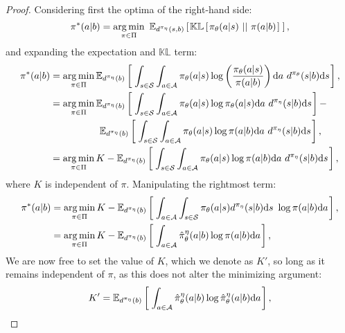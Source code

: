 \begin{proof}
Considering first the optima of the right-hand side: 
\begin{equation}
    \pi^*(a|b) = \mathop{\operatorname{arg\,min}}_{\pi \in \Pi}\ \mathbb{E}_{d^{\pi_{\eta}}(s, b)}  \left[ \hspace*{0.1em}{}  \mathbb{KL} \left[ \hspace*{0.1em}{}  \pi_{\theta}(a|s) \ ||\ {} \pi(a|b) \hspace*{0.1em} \right]{}  \hspace*{0.1em} \right]{} ,
\end{equation}
and expanding the expectation and $\mathbb{KL}$ term:
\begin{align}
    \pi^*(a|b) &= \mathop{\argmin}_{\pi \in \Pi} \mathbb{E}_{d^{\pi_{\eta}}(b)}\lspsqb{}  \int_{s\in\mathcal{S}} \int_{a\in\mathcal{A}} \pi_{\theta}(a | s)  \log \left( \frac{\pi_{\theta}(a|s)}{\pi(a | b)} \right) \d a \ d^{\pi_{\theta}}(s | b) \d s \rspsqb{}  , \\%
    &= \mathop{\argmin}_{\pi \in \Pi} \mathbb{E}_{d^{\pi_{\eta}}(b)}\lspsqb{} \int_{s\in\mathcal{S}} \int_{a\in\mathcal{A}} \pi_{\theta}(a | s)  \log \pi_{\theta}(a|s) \d a \ d^{\pi_{\eta}}(s | b) \d s \rspsqb{}  - \\
    & \hspace*{1.8cm} \mathbb{E}_{d^{\pi_{\eta}}(b)}\lspsqb{}  \int_{s\in\mathcal{S}} \int_{a\in\mathcal{A}} \pi_{\theta}(a | s)  \log \pi(a|b) \d a \ d^{\pi_{\eta}}(s | b) \d s \rspsqb{} , \\%
    &= \mathop{\argmin}_{\pi \in \Pi} K - \mathbb{E}_{d^{\pi_{\eta}}(b)}\lspsqb{} \int_{s\in\mathcal{S}} \int_{a\in\mathcal{A}} \pi_{\theta}(a | s)  \log \pi(a|b) \d a \ d^{\pi_{\eta}}(s | b) \d s \rspsqb{}  ,
\end{align}
where $K$ is independent of $\pi$.  Manipulating the rightmost term:
\begin{align}
    \pi^*(a|b) &= \mathop{\operatorname{arg\,min}}_{\pi \in \Pi} K - \mathbb{E}_{d^{\pi_{\eta}}(b)}\left[ \hspace*{0.1em}{} \int_{a\in\mathcal{A}} \int_{s\in\mathcal{S}} \pi_{\theta}(a | s) d^{\pi_{\eta}}(s | b) \mathrm{d} s \  \log \pi(a | b)  \mathrm{d} a \hspace*{0.1em} \right]{} , \\
    &= \mathop{\operatorname{arg\,min}}_{\pi \in \Pi} K - \mathbb{E}_{d^{\pi_{\eta}}(b)}\left[ \hspace*{0.1em}{} \int_{a\in\mathcal{A}} \hat{\pi}_{\theta}^{\eta}(a | b) \log \pi(a | b)  \mathrm{d} a \hspace*{0.1em} \right]{}  , 
\end{align}
We are now free to set the value of $K$, which we denote as $K'$, so long as it remains independent of $\pi$, as this does not alter the minimizing argument:
\begin{align}
    K' &= \mathbb{E}_{d^{\pi_{\eta}}(b)}\lspsqb{}  \int_{a\in\mathcal{A}} \hat{\pi}_{\theta}^{\eta}(a | b) \log \hat{\pi}_{\theta}^{\eta}(a | b)  \d a \rspsqb{} , \\

\end{align}
\end{proof}
